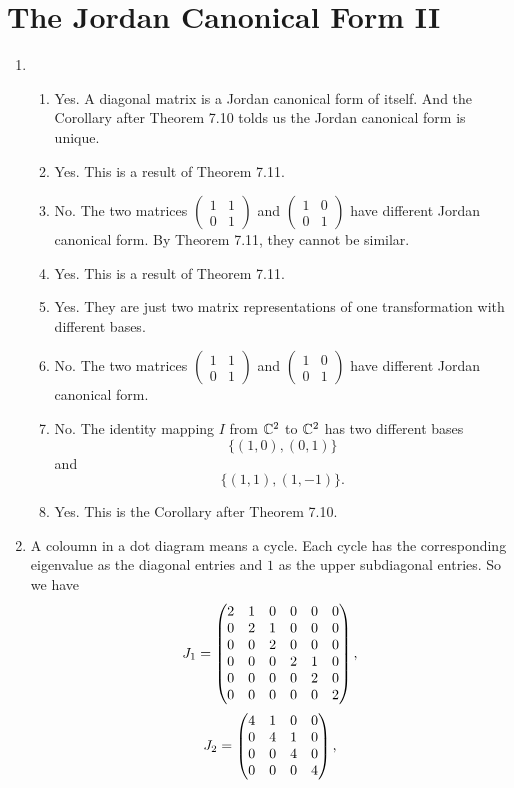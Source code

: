\section{The Jordan Canonical Form II}
\begin{enumerate}
\item \begin{enumerate}
\item Yes. A diagonal matrix is a Jordan canonical form of itself. And the Corollary after Theorem 7.10 tolds us the Jordan canonical form is unique.
\item Yes. This is a result of Theorem 7.11.
\item No. The two matrices $\begin{pmatrix}1&1\\0&1\end{pmatrix}$ and $\begin{pmatrix}1&0\\0&1\end{pmatrix}$ have different Jordan canonical form. By Theorem 7.11, they cannot be similar.
\item Yes. This is a result of Theorem 7.11.
\item Yes. They are just two matrix representations of one transformation with different bases.
\item No. The two matrices $\begin{pmatrix}1&1\\0&1\end{pmatrix}$ and $\begin{pmatrix}1&0\\0&1\end{pmatrix}$ have different Jordan canonical form.
\item No. The identity mapping $I$ from $\mathbb{C}^2$ to $\mathbb{C}^2$ has two different bases 
\[\{(1,0),(0,1)\}\]
and 
\[\{(1,1),(1,-1)\}.\]
\item Yes. This is the Corollary after Theorem 7.10.
\end{enumerate}
\item A coloumn in a dot diagram means a cycle. Each cycle has the corresponding eigenvalue as the diagonal entries and $1$ as the upper subdiagonal entries. So we have 
\[J_1=\begin{pmatrix}2 & 1 & 0 & 0 & 0 & 0\cr 0 & 2 & 1 & 0 & 0 & 0\cr 0 & 0 & 2 & 0 & 0 & 0\cr 0 & 0 & 0 & 2 & 1 & 0\cr 0 & 0 & 0 & 0 & 2 & 0\cr 0 & 0 & 0 & 0 & 0 & 2\end{pmatrix},\]
\[J_2=\begin{pmatrix}4 & 1 & 0 & 0\cr 0 & 4 & 1 & 0\cr 0 & 0 & 4 & 0\cr 0 & 0 & 0 & 4\end{pmatrix},\]

\end{enumerate}
